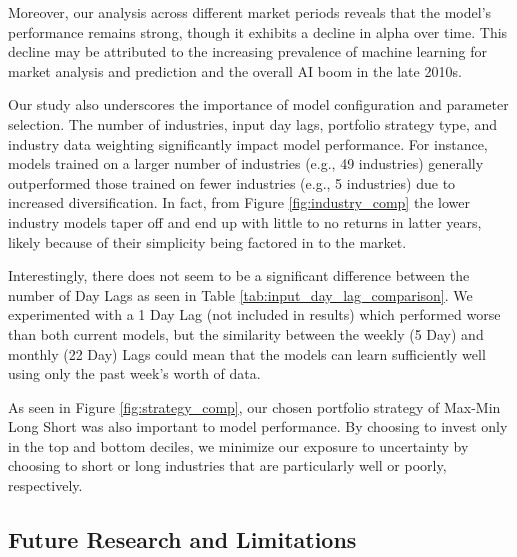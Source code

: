 \documentclass{article}
\begin{document}
Moreover, our analysis across different market periods reveals that the model’s performance remains strong, though it exhibits a decline in alpha over time. This decline may be attributed to the increasing prevalence of machine learning for market analysis and prediction and the overall AI boom in the late 2010s.

Our study also underscores the importance of model configuration and parameter selection. The number of industries, input day lags, portfolio strategy type, and industry data weighting significantly impact model performance. For instance, models trained on a larger number of industries (e.g., 49 industries) generally outperformed those trained on fewer industries (e.g., 5 industries) due to increased diversification. In fact, from Figure \ref{fig:industry_comp} the lower industry models taper off and end up with little to no returns in latter years, likely because of their simplicity being factored in to the market. 

Interestingly, there does not seem to be a significant difference between the number of Day Lags as seen in Table \ref{tab:input_day_lag_comparison}. We experimented with a 1 Day Lag (not included in results) which performed worse than both current models, but the similarity between the weekly (5 Day) and monthly (22 Day) Lags could mean that the models can learn sufficiently well using only the past week's worth of data.

As seen in Figure \ref{fig:strategy_comp}, our chosen portfolio strategy of Max-Min Long Short was also important to model performance. By choosing to invest only in the top and bottom deciles, we minimize our exposure to uncertainty by choosing to short or long industries that are particularly well or poorly, respectively.

\medskip

\subsection{Future Research and Limitations}
\end{document}
